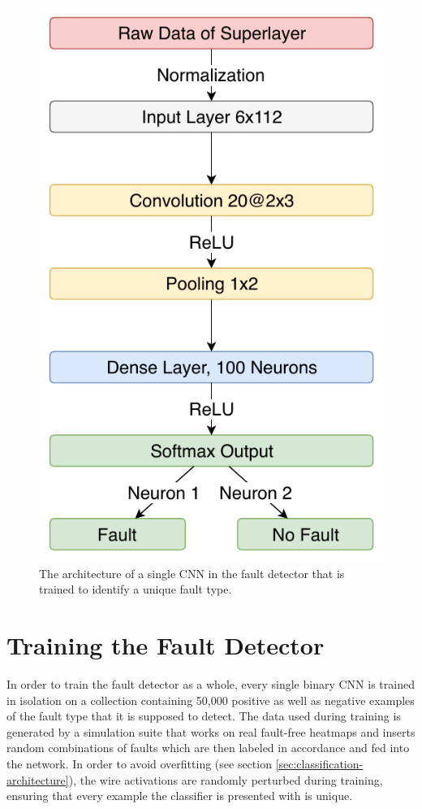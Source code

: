 \begin{figure}[h]
  \centering
  \includegraphics[height=.5\textheight]{../figures/fault_architecture}
  \caption{The architecture of a single CNN in the fault detector that
  is trained to identify a unique fault type.}
  \label{fig:fault-architecture}
\end{figure}

\section{Training the Fault Detector}

In order to train the fault detector as a whole, every single binary
CNN is trained in isolation on a collection containing 50,000 positive
as well as negative examples of the fault type that it is supposed to
detect. The data used during training is
generated by a simulation suite that works on real fault-free heatmaps
and inserts random combinations of faults which are then labeled in
accordance and fed into the network. In order to avoid overfitting
(see section \ref{sec:classification-architecture}), the wire activations
are randomly perturbed during training, ensuring that every example
the classifier is presented with is unique.

